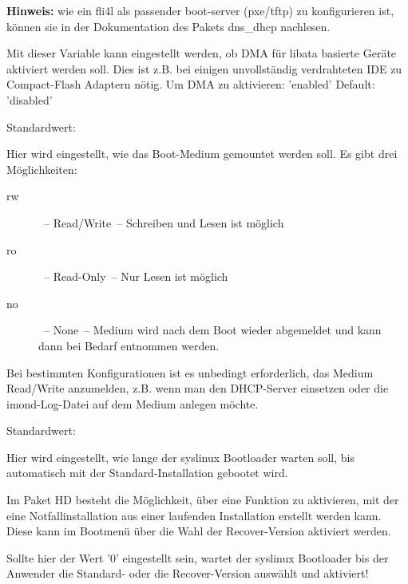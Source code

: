 \begin{description}
  \textbf{Hinweis:} wie ein fli4l als passender boot-server (pxe/tftp) zu 
  konfigurieren ist, können sie in der Dokumentation des Pakets dns\_dhcp nachlesen.\\
  

  Mit dieser Variable kann eingestellt werden, ob DMA für libata basierte Geräte
  aktiviert werden soll. Dies ist z.B. bei einigen unvollständig verdrahteten
  IDE zu Compact-Flash Adaptern nötig. Um DMA zu aktivieren: 'enabled'
  Default: 'disabled'

  
  Standardwert: 

  {Hier wird eingestellt, wie das Boot-Medium gemountet werden
    soll. Es gibt drei Möglichkeiten:

    \begin{description}
      \item[rw]~-- Read/Write~-- Schreiben und Lesen ist möglich
      \item[ro]~-- Read-Only~-- Nur Lesen ist möglich
      \item[no]~-- None~-- Medium wird nach dem Boot wieder
        abgemeldet und kann dann bei Bedarf entnommen werden.
    \end{description}

    Bei bestimmten Konfigurationen ist es unbedingt erforderlich, das
    Medium Read/\-Write anzumelden, z.B. wenn man den DHCP-Server
    einsetzen oder die imond-Log-Datei auf dem Medium anlegen
    möchte.}


    
  Standardwert: 

  {Hier wird eingestellt, wie lange der syslinux Bootloader warten soll,
    bis automatisch mit der Standard-Installation gebootet wird.

    Im Paket HD besteht die Möglichkeit, über  eine Funktion
    zu aktivieren, mit der eine Notfallinstallation aus einer laufenden
    Installation erstellt werden kann. Diese kann im Bootmenü über die Wahl
    der Recover-Version aktiviert werden.

    Sollte hier der Wert '0' eingestellt sein, wartet der syslinux Bootloader
    bis der Anwender die Standard- oder die Recover-Version auswählt und
    aktiviert!}



\end{description}
